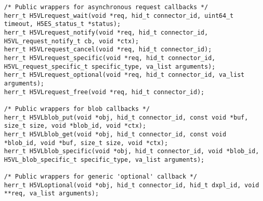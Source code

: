\begin{appendices}
\begin{lstlisting}
/* Public wrappers for asynchronous request callbacks */                         
herr_t H5VLrequest_wait(void *req, hid_t connector_id, uint64_t timeout, H5ES_status_t *status);
herr_t H5VLrequest_notify(void *req, hid_t connector_id, H5VL_request_notify_t cb, void *ctx);
herr_t H5VLrequest_cancel(void *req, hid_t connector_id);                 
herr_t H5VLrequest_specific(void *req, hid_t connector_id, H5VL_request_specific_t specific_type, va_list arguments);
herr_t H5VLrequest_optional(void *req, hid_t connector_id, va_list arguments);
herr_t H5VLrequest_free(void *req, hid_t connector_id);                   
                                                                                 
/* Public wrappers for blob callbacks */                                         
herr_t H5VLblob_put(void *obj, hid_t connector_id, const void *buf, size_t size, void *blob_id, void *ctx);
herr_t H5VLblob_get(void *obj, hid_t connector_id, const void *blob_id, void *buf, size_t size, void *ctx);
herr_t H5VLblob_specific(void *obj, hid_t connector_id, void *blob_id, H5VL_blob_specific_t specific_type, va_list arguments);
                                                                                 
/* Public wrappers for generic 'optional' callback */                            
herr_t H5VLoptional(void *obj, hid_t connector_id, hid_t dxpl_id, void **req, va_list arguments); 

\end{lstlisting}

\end{appendices}


